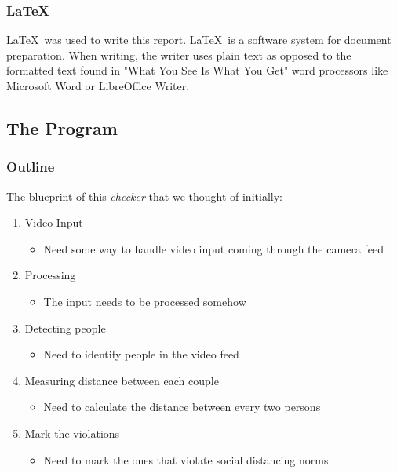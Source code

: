 \documentclass[a4paper]{article}
\begin{document}
\subsubsection{\LaTeX}
\LaTeX\ was used to write this report. \LaTeX\ is a software system for document
preparation. When writing, the writer uses plain text as opposed to the formatted
text found in "What You See Is What You Get" word processors like Microsoft Word
or LibreOffice Writer.
\pagebreak

\subsection{The Program}

\subsubsection{Outline}
The blueprint of this \textit{checker} that we thought of initially:

\begin{enumerate}
    \item Video Input
          \begin{itemize}[label={}]
              \item Need some way to handle video input coming through the camera feed
          \end{itemize}

    \item Processing
          \begin{itemize}[label={}]
              \item The input needs to be processed somehow
          \end{itemize}

    \item Detecting people
          \begin{itemize}[label={}]
              \item Need to identify people in the video feed
          \end{itemize}

    \item Measuring distance between each couple
          \begin{itemize}[label={}]
              \item Need to calculate the distance between every two persons
          \end{itemize}

    \item Mark the violations
          \begin{itemize}[label={}]
              \item Need to mark the ones that violate social distancing norms
          \end{itemize}
\end{enumerate}
\end{document}
